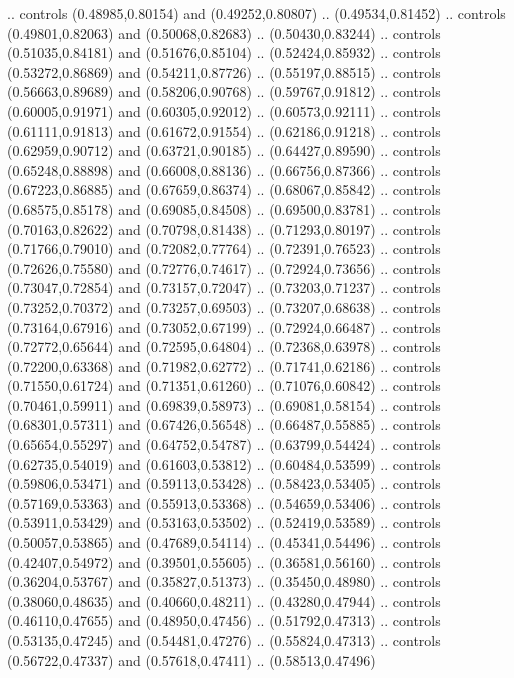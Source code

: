     .. controls (0.48985,0.80154) and (0.49252,0.80807) .. (0.49534,0.81452)
    .. controls (0.49801,0.82063) and (0.50068,0.82683) .. (0.50430,0.83244)
    .. controls (0.51035,0.84181) and (0.51676,0.85104) .. (0.52424,0.85932)
    .. controls (0.53272,0.86869) and (0.54211,0.87726) .. (0.55197,0.88515)
    .. controls (0.56663,0.89689) and (0.58206,0.90768) .. (0.59767,0.91812)
    .. controls (0.60005,0.91971) and (0.60305,0.92012) .. (0.60573,0.92111)
    .. controls (0.61111,0.91813) and (0.61672,0.91554) .. (0.62186,0.91218)
    .. controls (0.62959,0.90712) and (0.63721,0.90185) .. (0.64427,0.89590)
    .. controls (0.65248,0.88898) and (0.66008,0.88136) .. (0.66756,0.87366)
    .. controls (0.67223,0.86885) and (0.67659,0.86374) .. (0.68067,0.85842)
    .. controls (0.68575,0.85178) and (0.69085,0.84508) .. (0.69500,0.83781)
    .. controls (0.70163,0.82622) and (0.70798,0.81438) .. (0.71293,0.80197)
    .. controls (0.71766,0.79010) and (0.72082,0.77764) .. (0.72391,0.76523)
    .. controls (0.72626,0.75580) and (0.72776,0.74617) .. (0.72924,0.73656)
    .. controls (0.73047,0.72854) and (0.73157,0.72047) .. (0.73203,0.71237)
    .. controls (0.73252,0.70372) and (0.73257,0.69503) .. (0.73207,0.68638)
    .. controls (0.73164,0.67916) and (0.73052,0.67199) .. (0.72924,0.66487)
    .. controls (0.72772,0.65644) and (0.72595,0.64804) .. (0.72368,0.63978)
    .. controls (0.72200,0.63368) and (0.71982,0.62772) .. (0.71741,0.62186)
    .. controls (0.71550,0.61724) and (0.71351,0.61260) .. (0.71076,0.60842)
    .. controls (0.70461,0.59911) and (0.69839,0.58973) .. (0.69081,0.58154)
    .. controls (0.68301,0.57311) and (0.67426,0.56548) .. (0.66487,0.55885)
    .. controls (0.65654,0.55297) and (0.64752,0.54787) .. (0.63799,0.54424)
    .. controls (0.62735,0.54019) and (0.61603,0.53812) .. (0.60484,0.53599)
    .. controls (0.59806,0.53471) and (0.59113,0.53428) .. (0.58423,0.53405)
    .. controls (0.57169,0.53363) and (0.55913,0.53368) .. (0.54659,0.53406)
    .. controls (0.53911,0.53429) and (0.53163,0.53502) .. (0.52419,0.53589)
    .. controls (0.50057,0.53865) and (0.47689,0.54114) .. (0.45341,0.54496)
    .. controls (0.42407,0.54972) and (0.39501,0.55605) .. (0.36581,0.56160)
    .. controls (0.36204,0.53767) and (0.35827,0.51373) .. (0.35450,0.48980)
    .. controls (0.38060,0.48635) and (0.40660,0.48211) .. (0.43280,0.47944)
    .. controls (0.46110,0.47655) and (0.48950,0.47456) .. (0.51792,0.47313)
    .. controls (0.53135,0.47245) and (0.54481,0.47276) .. (0.55824,0.47313)
    .. controls (0.56722,0.47337) and (0.57618,0.47411) .. (0.58513,0.47496)

